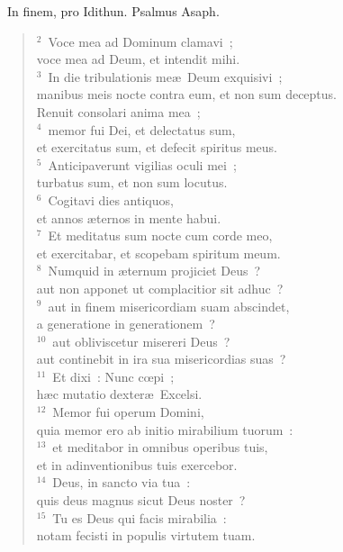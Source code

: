 ~\lettrine[lines=10,image=true,loversize=0.05,lraise=-0.03]{I}{}n finem, pro Idithun. Psalmus Asaph.
\begin{flushleft}\begin{verse}\vspace{6pt}${}^{2}$~Voce mea ad Dominum clamavi~;\\ voce mea ad Deum, et intendit mihi.\\
${}^{3}$~In die tribulationis me\ae\ Deum exquisivi~;\\ manibus meis nocte contra eum, et non sum deceptus.\\ Renuit consolari anima mea~;\\
${}^{4}$~memor fui Dei, et delectatus sum,\\ et exercitatus sum, et defecit spiritus meus.\\
${}^{5}$~Anticipaverunt vigilias oculi mei~;\\ turbatus sum, et non sum locutus.\\
${}^{6}$~Cogitavi dies antiquos,\\ et annos \ae ternos in mente habui.\\
${}^{7}$~Et meditatus sum nocte cum corde meo,\\ et exercitabar, et scopebam spiritum meum.\\
${}^{8}$~Numquid in \ae ternum projiciet Deus~?\\ aut non apponet ut complacitior sit adhuc~?\\
${}^{9}$~aut in finem misericordiam suam abscindet,\\ a generatione in generationem~?\\
${}^{10}$~aut obliviscetur misereri Deus~?\\ aut continebit in ira sua misericordias suas~?\\
${}^{11}$~Et dixi~: Nunc cœpi~;\\ h\ae c mutatio dexter\ae\ Excelsi.\\
${}^{12}$~Memor fui operum Domini,\\ quia memor ero ab initio mirabilium tuorum~:\\
${}^{13}$~et meditabor in omnibus operibus tuis,\\ et in adinventionibus tuis exercebor.\\
${}^{14}$~Deus, in sancto via tua~:\\ quis deus magnus sicut Deus noster~?\\
${}^{15}$~Tu es Deus qui facis mirabilia~:\\ notam fecisti in populis virtutem tuam.\\

\end{verse}
\end{flushleft}
